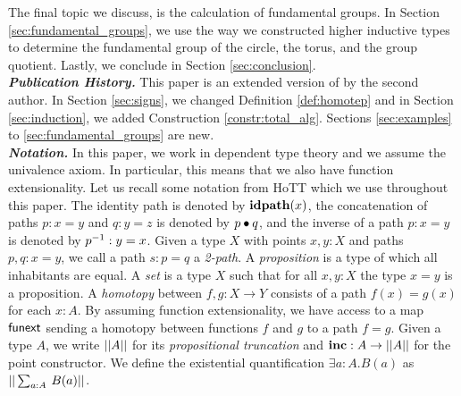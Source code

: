 The final topic we discuss, is the calculation of fundamental groups.
In Section \ref{sec:fundamental_groups}, we use the way we constructed higher inductive types to determine the fundamental group of the circle, the torus, and the group quotient.
Lastly, we conclude in Section \ref{sec:conclusion}.
\\
\emph{\textbf{Publication History.}}
This paper is an extended version of \cite{nmvdw2020} by the second author.
In Section \ref{sec:signs}, we changed Definition \ref{def:homotep} and in Section \ref{sec:induction}, we added Construction \ref{constr:total_alg}.
Sections \ref{sec:examples} to \ref{sec:fundamental_groups} are new.
\\
\emph{\textbf{Notation.}}
In this paper, we work in dependent type theory and we assume the univalence axiom. In particular, this means that we also have function extensionality.
Let us recall some notation from HoTT which we use throughout this paper.
The identity path is denoted by $\operatorname{\mathbf{idpath}}(x)$, the concatenation of paths $p : x = y$ and $q : y = z$ is denoted by $p \bullet q$, and the inverse of a path $p : x = y$ is denoted by $p^{-1} : y = x$.
Given a type $X$ with points $x, y : X$ and paths $p, q : x = y$, we call a path $s : p = q$ a \emph{2-path}.
A \emph{proposition} is a type of which all inhabitants are equal.
A \emph{set} is a type $X$ such that for all $x, y : X$ the type $x = y$ is a proposition.
A \emph{homotopy} between $f, g : X \rightarrow Y$ consists of a path
$f(x) = g(x)$ for each $x : A$. By assuming function
extensionality, we have access to a map $\mathsf{funext}$ sending a
homotopy between functions $f$ and $g$ to a path $f = g$. Given a
type $A$, we write $|| A ||$ for its \emph{propositional truncation}
and $\operatorname{\mathbf{inc}} : A \to || A ||$ for the point constructor. We define the existential quantification
$\exists a : A.B(a)$ as $\PT{\Sum {a : A}. B(a)}$.
